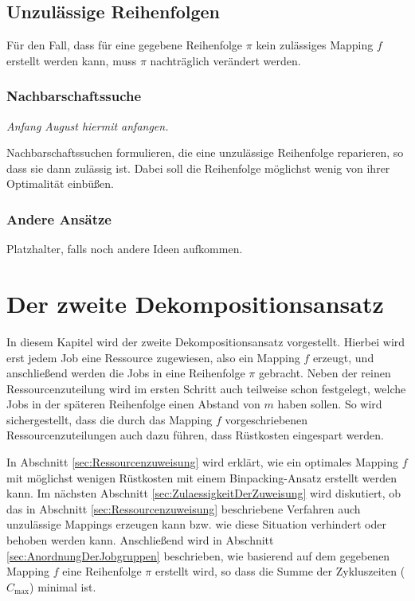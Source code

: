 \documentclass{scrreprt}
\begin{document}
\section{Unzulässige Reihenfolgen}
\label{UnzulaessigeReihenfolgen}
Für den Fall, dass für eine gegebene Reihenfolge $\pi$ kein zulässiges Mapping $f$ erstellt werden kann, muss $\pi$ nachträglich verändert werden.

\subsection{Nachbarschaftssuche}

\textit{Anfang August hiermit anfangen.}

Nachbarschaftssuchen formulieren, die eine unzulässige Reihenfolge reparieren, so dass sie dann zulässig ist.
Dabei soll die Reihenfolge möglichst wenig von ihrer Optimalität einbüßen.

\subsection{Andere Ansätze}
Platzhalter, falls noch andere Ideen aufkommen.






\chapter{Der zweite Dekompositionsansatz}
In diesem Kapitel wird der zweite Dekompositionsansatz vorgestellt.
Hierbei wird erst jedem Job eine Ressource zugewiesen, also ein Mapping $f$ erzeugt,
und anschließend werden die Jobs in eine Reihenfolge $\pi$ gebracht.
Neben der reinen Ressourcenzuteilung wird im ersten Schritt auch teilweise schon festgelegt, welche Jobs in der späteren Reihenfolge einen Abstand von $m$ haben sollen.
So wird sichergestellt, dass die durch das Mapping $f$ vorgeschriebenen Ressourcenzuteilungen auch dazu führen, dass Rüstkosten eingespart werden.

In Abschnitt \ref{sec:Ressourcenzuweisung} wird erklärt, wie ein optimales Mapping $f$ mit möglichst wenigen Rüstkosten mit einem Binpacking-Ansatz erstellt werden kann.
Im nächsten Abschnitt \ref{sec:ZulaessigkeitDerZuweisung} wird diskutiert, ob das in Abschnitt \ref{sec:Ressourcenzuweisung} beschriebene Verfahren
auch unzulässige Mappings erzeugen kann bzw. wie diese Situation verhindert oder behoben werden kann.
Anschließend wird in Abschnitt \ref{sec:AnordnungDerJobgruppen} beschrieben, wie basierend auf dem gegebenen Mapping $f$ eine Reihenfolge $\pi$ erstellt wird,
so dass die Summe der Zykluszeiten ($C_{\max}$) minimal ist.
\end{document}
